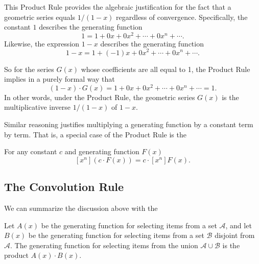 This Product Rule provides the algebraic justification for the fact
that a geometric series equals $1/(1-x)$ regardless of convergence.
Specifically, the constant $1$ describes the generating function
\[
1 = 1+ 0x+ 0x^2 + \cdots + 0x^n + \cdots.
\]
Likewise, the expression $1-x$ describes the generating function
\[
1-x = 1+ (-1)x+ 0x^2 + \cdots + 0x^n + \cdots.
\]
\iffalse Since all but the first two coefficents for $1-x$ are zero,
the Product Rule implies that for any generating function $F(x)$,
\begin{align*}
[x^0]((1-x)F(x)) & = f_0\\
[x^n]((1-x)F(x)) & = f_n-f_{n-1} & for $n>0$,
\end{align*}
so in particular for geometric series $G(x)$, the only nonzero coefficent
of $(1-x)\cdot G(x)$ is the coefficient of $x^0$, which equals $g_0 = 1$.
\fi
So for the series $G(x)$ whose coefficients are all equal to 1, the
Product Rule implies in a purely formal way that
\[
(1-x)\cdot G(x) = 1+ 0x+ 0x^2 + \cdots + 0x^n + \cdots = 1.
\]
In other words, under the Product Rule, the geometric series $G(x)$ is
the multiplicative inverse $1/(1-x)$ of $1-x$.

Similar reasoning justifies multiplying a generating function by a
constant term by term.  That is, a special case of the Product Rule is
the
\begin{rul*}
For any constant $c$ and generating function $F(x)$
\begin{equation}\label{xncFcn}
[x^n](c \cdot F(x)) = c \cdot [x^n]F(x).
\end{equation}
\end{rul*}

\iffalse
Letting
\[
P(x) = (1-x) \cdot (1+x+x^2+\cdots+x^n+\cdots),
\]
the Product Rule gives
\begin{align*}
[x^0]P(x) & = 1 \cdot 1 = 1,\\
[x^{n+1}]P(x)& = 1\cdot 1+ (-1)\cdot 1 +0\cdot 1 +\cdots + 0\cdot 1 = 0.
\end{align*}
That is,
\[
P(x) = 1 + 0\cdot x +  0\cdot x^2 + \cdots = 1.
\]
\fi

\subsection{The Convolution Rule}

We can summarize the discussion above with the
\begin{mathrule*}\label{convolution_rule}
Let $A(x)$ be the generating function for selecting items from a set
$\mathcal{A}$, and let $B(x)$ be the generating function for selecting
items from a set $\mathcal{B}$ disjoint from $\mathcal{A}$.  The
generating function for selecting items from the union $\mathcal{A} \cup
\mathcal{B}$ is the product $A(x) \cdot B(x)$.
\end{mathrule*}

